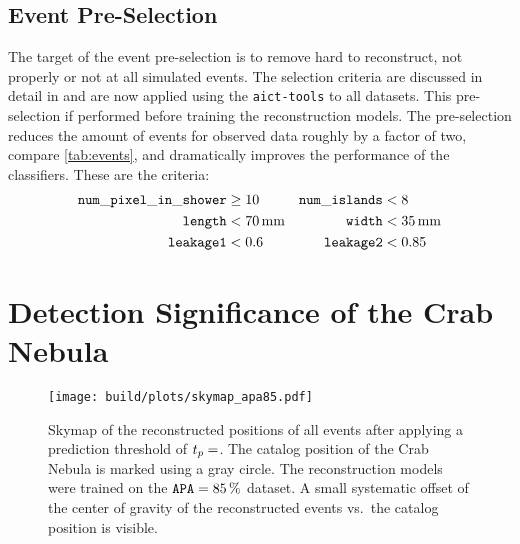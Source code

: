 \subsection{Event Pre-Selection}\label{sec:precuts}
The target of the event pre-selection is to remove hard to reconstruct, not properly
or not at all simulated events.
The selection criteria are discussed in detail in \cite[56\psqq]{phd-temme} and are
now applied using the \texttt{aict-tools} to all datasets.
This pre-selection if performed before training the reconstruction models.
The pre-selection reduces the amount of events for observed data roughly by a factor of two, compare \autoref{tab:events}, and dramatically improves the performance of the classifiers.
These are the criteria:
\begin{align*}
  \mathtt{num\_pixel\_in\_shower} &\geq 10 &
  \mathtt{num\_islands} &< 8 \\
  \mathtt{length} &< \SI{70}{\milli\meter} &
  \mathtt{width} &< \SI{35}{\milli\meter} \\
  \mathtt{leakage1} &< 0.6  &
  \mathtt{leakage2} &< 0.85
\end{align*}




\section{Detection Significance of the Crab Nebula}\label{sec:detection}
\begin{figure}
  \centering
  \texttt{[image: build/plots/skymap\_apa85.pdf]}
  \caption{%
    Skymap of the reconstructed positions of all events after applying a
    prediction threshold of $t_p = \protect\unskip$.
    The catalog position of the Crab Nebula is marked using a gray circle.
    The reconstruction models were trained on the $\mathtt{APA} = \SI{85}{\percent}$ dataset.
    A small systematic offset of the center of gravity of the reconstructed events
    vs.\ the catalog position is visible.
  }\label{fig:skymap}
\end{figure}


